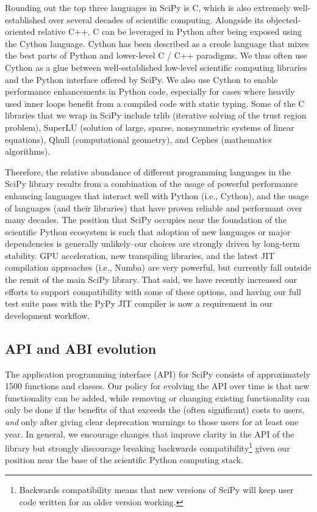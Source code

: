 \documentclass[fleqn,10pt]{wlscirep}
\begin{document}
Rounding out the top three languages in SciPy is C, which is also extremely
well-established over several decades\cite{Kernighan:1988:CPL:576122} of
scientific computing. Alongside its objected-oriented relative C++, C can be
leveraged in Python after being exposed using the Cython language. Cython has
been described as a creole language that mixes the best parts of Python and
lower-level C / C++ paradigms\cite{behnel2011cython}. We thus often use Cython
as a glue between well-established low-level scientific computing libraries and
the Python interface offered by SciPy. We also use Cython to enable performance
enhancements in Python code, especially for cases where heavily used inner
loops benefit from a compiled code with static typing. Some of the C libraries
that we wrap in SciPy include trlib\cite{doi:10.1080/10556788.2018.1449842}
(iterative solving of the trust region problem),
SuperLU\cite{li05,superlu_ug99} (solution of large, sparse, nonsymmetric
systems of linear equations), Qhull\cite{Barber:1996:QAC:235815.235821}
(computational geometry), and Cephes\cite{cephes_netlib} (mathematics
algorithms). 

Therefore, the relative abundance of different programming languages in the
SciPy library results from a combination of the usage of powerful performance
enhancing languages that interact well with Python (i.e., Cython), and the
usage of languages (and their libraries) that have proven reliable and
performant over many decades. The position that SciPy occupies near the
foundation of the scientific Python ecosystem is such that adoption of new
languages or major dependencies is generally unlikely--our choices are strongly
driven by long-term stability. GPU acceleration, new transpiling libraries, and
the latest JIT compilation approaches (i.e.,
Numba\cite{Lam:2015:NLP:2833157.2833162}) are very powerful, but currently fall
outside the remit of the main SciPy library. That said, we have recently
increased our efforts to support compatibility with some of these options, and
having our full test suite pass with the PyPy JIT
compiler\cite{Bolz:2009:TMP:1565824.1565827} is now a requirement in our
development workflow.

\subsection*{API and ABI evolution}

The application programming interface (API) for SciPy consists of approximately
1500 functions and classes.  Our policy for evolving the API over time is that
new functionality can be added, while removing or changing existing
functionality can only be done if the benefits of that exceeds the (often
significant) costs to users, \textit{and} only after giving clear deprecation
warnings to those users for at least one year.  In general, we encourage
changes that improve clarity in the API of the library but strongly discourage
breaking backwards compatibility\footnote{
    Backwards compatibility means that new versions of SciPy will keep user
    code written for an older version working.}
given our position near the base of the scientific Python computing stack.
\end{document}
